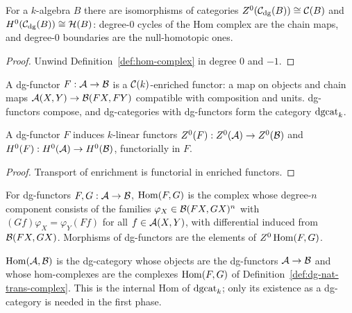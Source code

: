\begin{lemma}
\label{lem:Z0-H0-complexes}
For a $k$-algebra $B$ there are isomorphisms of categories
$Z^0(\mathcal{C}_{\mathrm{dg}}(B)) \cong \mathcal{C}(B)$ and $H^0(\mathcal{C}_{\mathrm{dg}}(B)) \cong \mathcal{H}(B)$: degree-$0$ cycles of the
Hom complex are the chain maps, and degree-$0$ boundaries are the null-homotopic ones.
\end{lemma}
\begin{proof}
Unwind Definition~\ref{def:hom-complex} in degree $0$ and $-1$.
\end{proof}

\begin{definition}[dg-functors]
\label{def:dg-functor}
A dg-functor $F : \mathcal{A} \to \mathcal{B}$ is a $\mathcal{C}(k)$-enriched functor: a map on objects and chain
maps $\mathcal{A}(X,Y) \to \mathcal{B}(FX,FY)$ compatible with composition and units. dg-functors compose,
and dg-categories with dg-functors form the category $\mathrm{dgcat}_k$.
\end{definition}

\begin{lemma}
\label{lem:dg-functor-Z0-H0}
A dg-functor $F$ induces $k$-linear functors $Z^0(F) : Z^0(\mathcal{A}) \to Z^0(\mathcal{B})$ and
$H^0(F) : H^0(\mathcal{A}) \to H^0(\mathcal{B})$, functorially in $F$.
\end{lemma}
\begin{proof}
Transport of enrichment is functorial in enriched functors.
\end{proof}

\begin{definition}
\label{def:dg-nat-trans-complex}
For dg-functors $F, G : \mathcal{A} \to \mathcal{B}$, $\operatorname{Hom}(F,G)$ is the complex whose degree-$n$
component consists of the families $\varphi_X \in \mathcal{B}(FX,GX)^n$ with
$(Gf)\varphi_X = \varphi_Y (Ff)$ for all $f \in \mathcal{A}(X,Y)$, with differential induced from
$\mathcal{B}(FX,GX)$. Morphisms of dg-functors are the elements of $Z^0 \operatorname{Hom}(F,G)$.
\end{definition}

\begin{definition}
\label{def:dg-functor-category}
$\operatorname{Hom}(\mathcal{A},\mathcal{B})$ is the dg-category whose objects are the dg-functors $\mathcal{A} \to \mathcal{B}$ and
whose hom-complexes are the complexes $\operatorname{Hom}(F,G)$ of
Definition~\ref{def:dg-nat-trans-complex}. This is the internal Hom of $\mathrm{dgcat}_k$; only its
existence as a dg-category is needed in the first phase.
\end{definition}

